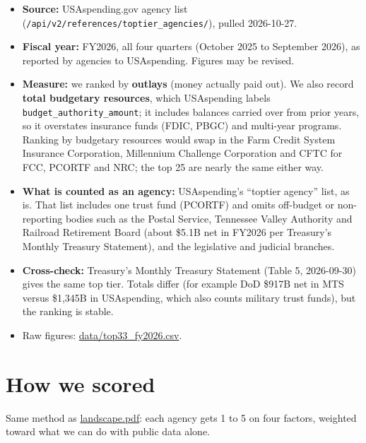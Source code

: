 \documentclass[letterpaper,11pt]{article}
\providecommand{\tightlist}{\setlength{\itemsep}{0pt}\setlength{\parskip}{0pt}}
\begin{document}
\begin{itemize}
\tightlist
\item
  \textbf{Source:} USAspending.gov agency list
  (\texttt{/api/v2/references/toptier\_agencies/}), pulled 2026-10-27.
\item
  \textbf{Fiscal year:} FY2026, all four quarters (October 2025 to
  September 2026), as reported by agencies to USAspending. Figures may
  be revised.
\item
  \textbf{Measure:} we ranked by \textbf{outlays} (money actually paid
  out). We also record \textbf{total budgetary resources}, which
  USAspending labels \texttt{budget\_authority\_amount}; it includes
  balances carried over from prior years, so it overstates insurance
  funds (FDIC, PBGC) and multi-year programs. Ranking by budgetary
  resources would swap in the Farm Credit System Insurance Corporation,
  Millennium Challenge Corporation and CFTC for FCC, PCORTF and NRC; the
  top 25 are nearly the same either way.
\item
  \textbf{What is counted as an agency:} USAspending's ``toptier
  agency'' list, as is. That list includes one trust fund (PCORTF) and
  omits off-budget or non-reporting bodies such as the Postal Service,
  Tennessee Valley Authority and Railroad Retirement Board (about \$5.1B
  net in FY2026 per Treasury's Monthly Treasury Statement), and the
  legislative and judicial branches.
\item
  \textbf{Cross-check:} Treasury's Monthly Treasury Statement (Table 5,
  2026-09-30) gives the same top tier. Totals differ (for example DoD
  \$917B net in MTS versus \$1,345B in USAspending, which also counts
  military trust funds), but the ranking is stable.
\item
  Raw figures: \url{data/top33_fy2026.csv}.
\end{itemize}

\hypertarget{how-we-scored}{%
\section{How we scored}\label{how-we-scored}}

Same method as \url{landscape.pdf}: each agency gets 1 to 5 on four
factors, weighted toward what we can do with public data alone.
\end{document}
